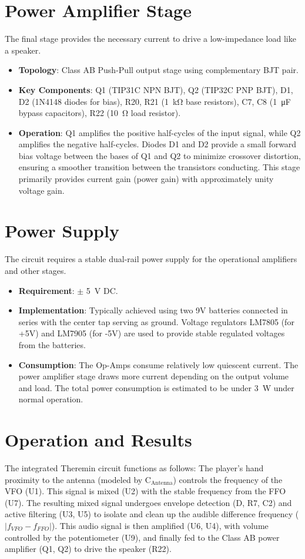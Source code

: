 \documentclass[conference]{IEEEtran}
\begin{document}
\section{Power Amplifier Stage}
The final stage provides the necessary current to drive a low-impedance load like a speaker.
\begin{itemize}
    \item \textbf{Topology}: Class AB Push-Pull output stage using complementary BJT pair.
    \item \textbf{Key Components}: Q1 (TIP31C NPN BJT), Q2 (TIP32C PNP BJT), D1, D2 (1N4148 diodes for bias), R20, R21 (\SI{1}{\kilo\ohm} base resistors), C7, C8 (\SI{1}{\micro\farad} bypass capacitors), R22 (\SI{10}{\ohm} load resistor).
    \item \textbf{Operation}: Q1 amplifies the positive half-cycles of the input signal, while Q2 amplifies the negative half-cycles. Diodes D1 and D2 provide a small forward bias voltage between the bases of Q1 and Q2 to minimize crossover distortion, ensuring a smoother transition between the transistors conducting. This stage primarily provides current gain (power gain) with approximately unity voltage gain.
\end{itemize}

\section{Power Supply}
The circuit requires a stable dual-rail power supply for the operational amplifiers and other stages.
\begin{itemize}
    \item \textbf{Requirement}: $\pm$ \SI{5}{\volt} DC.
    \item \textbf{Implementation}: Typically achieved using two 9V batteries connected in series with the center tap serving as ground. Voltage regulators LM7805 (for +5V) and LM7905 (for -5V) are used to provide stable regulated voltages from the batteries.
    \item \textbf{Consumption}: The Op-Amps consume relatively low quiescent current. The power amplifier stage draws more current depending on the output volume and load. The total power consumption is estimated to be under \SI{3}{\watt} under normal operation.
\end{itemize}

\section{Operation and Results}
The integrated Theremin circuit functions as follows: The player's hand proximity to the antenna (modeled by C$_{\text{Antenna}}$) controls the frequency of the VFO (U1). This signal is mixed (U2) with the stable frequency from the FFO (U7). The resulting mixed signal undergoes envelope detection (D, R7, C2) and active filtering (U3, U5) to isolate and clean up the audible difference frequency ($|f_{VFO} - f_{FFO}|$). This audio signal is then amplified (U6, U4), with volume controlled by the potentiometer (U9), and finally fed to the Class AB power amplifier (Q1, Q2) to drive the speaker (R22).
\end{document}

